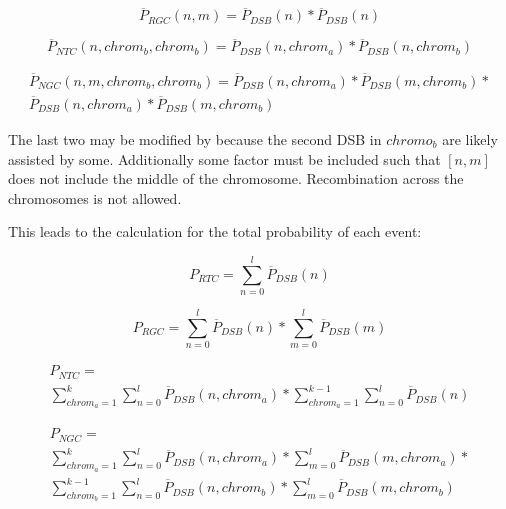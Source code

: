\documentclass{article}
\begin{document}
        \begin{equation}
            \overline{P}_{RGC}(n, m) = \overline{P}_{DSB}(n) * \overline{P}_{DSB}(n)
        \end{equation}

        \begin{equation}
            \overline{P}_{NTC}(n, chrom_b, chrom_b) = \overline{P}_{DSB}(n, chrom_a) * \overline{P}_{DSB}(n, chrom_b)
        \end{equation}

        \begin{multline}
            \overline{P}_{NGC}(n, m, chrom_b, chrom_b) = \overline{P}_{DSB}(n, chrom_a) * \overline{P}_{DSB}(m, chrom_b) * \\ \overline{P}_{DSB}(n, chrom_a) * \overline{P}_{DSB}(m, chrom_b)
        \end{multline}

        The last two may be modified by because the second DSB in \(chromo_b\) are likely assisted by some. Additionally some factor must be included such that \([n,m]\) does not include the middle of the chromosome.   Recombination across the chromosomes is not allowed.

        This leads to the calculation for the total probability of each event:

        \begin{equation}
            P_{RTC} = \sum_{n = 0}^{l}{\overline{P}_{DSB}(n)}
        \end{equation}

        \begin{equation}
            P_{RGC} = \sum_{n = 0}^{l}{\overline{P}_{DSB}(n)} * \sum_{m = 0}^{l}{\overline{P}_{DSB}(m)}
        \end{equation}

        \begin{multline}
            P_{NTC} = \\\sum_{chrom_a = 1}^{k}{\sum_{n = 0}^{l}{\overline{P}_{DSB}(n, chrom_a)}}*\sum_{chrom_a = 1}^{k-1}{\sum_{n = 0}^{l}{\overline{P}_{DSB}(n)}}
        \end{multline}

        \begin{multline}
            P_{NGC} = \\\sum_{chrom_a = 1}^{k}{\sum_{n = 0}^{l}{\overline{P}_{DSB}(n, chrom_a) * \sum_{m = 0}^{l}{\overline{P}_{DSB}(m, chrom_a)}}} * \\\sum_{chrom_b = 1}^{k-1}{\sum_{n = 0}^{l}{\overline{P}_{DSB}(n, chrom_b)} * \sum_{m = 0}^{l}{\overline{P}_{DSB}(m, chrom_b)}}
        \end{multline}
\end{document}
